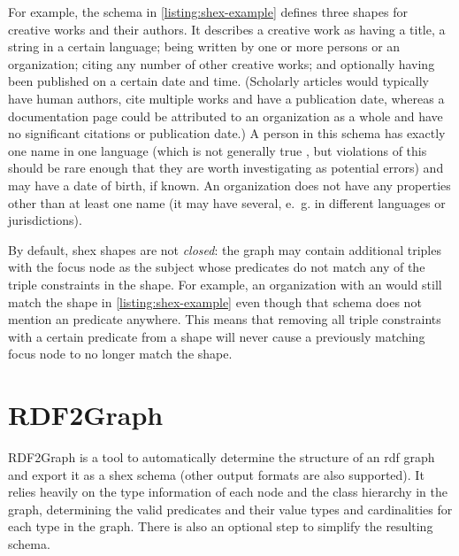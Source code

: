 For example, the schema in \cref{listing:shex-example} defines three \glspl{shape}
for creative works and their authors.
It describes a creative work as having a title, a string in a certain language;
being written by one or more persons or an organization;
citing any number of other creative works;
and optionally having been published on a certain date and time.
(Scholarly articles would typically have human authors,
cite multiple works and have a publication date,
whereas a documentation page could be attributed to an organization as a whole
and have no significant citations or publication date.)
A person in this \gls{schema} has exactly one name in one language
(which is not generally true \cite{falsehoods-programmers-believe-about-names},
but violations of this should be rare enough
that they are worth investigating as potential errors)
and may have a date of birth, if known.
An organization does not have any properties other than at least one name
(it may have several, e.~g. in different languages or jurisdictions).


By default, \gls{shex} \glspl{shape} are not \emph{closed}:
the graph may contain additional \glspl{triple} with the \gls{focus node} as the \gls{subject}
whose \glspl{predicate} do not match any of the \glspl{triple constraint} in the \gls{shape}.
For example, an organization with an  would still match the  shape in \cref{listing:shex-example}
even though that \gls{schema} does not mention an  \gls{predicate} anywhere.
This means that removing all \glspl{triple constraint} with a certain \gls{predicate} from a \gls{shape}
will never cause a previously matching \gls{focus node} to no longer match the \gls{shape}.

\section{\gls{RDF2Graph}}
\label{sec:Background:RDF2Graph}

\Gls{RDF2Graph} \cite{vanDam2015}
is a tool to automatically determine the structure of an \gls{rdf} graph
and export it as a \gls{shex} \gls{schema}
(other output formats are also supported).
It relies heavily on the type information of each node and the class hierarchy in the graph,
determining the valid \glspl{predicate} and their value types and cardinalities for each type in the graph.
There is also an optional step to simplify the resulting \gls{schema}.

